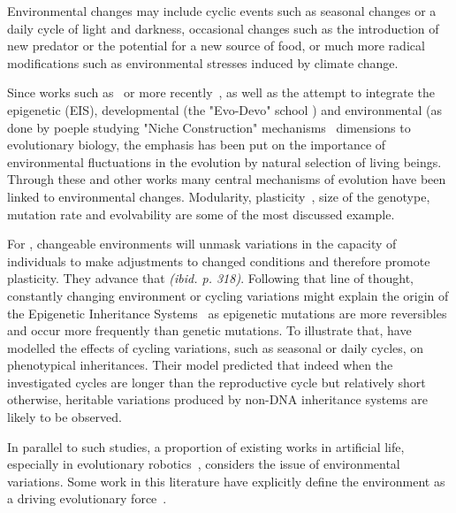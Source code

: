 Environmental changes may include cyclic events such as seasonal changes or a daily cycle of light and darkness, occasional changes such as the introduction of new predator or the potential for a new source of food, or much more radical modifications such as environmental stresses induced by climate change.

Since works such as~\citep{levins1968evolution} or more recently~\citep{jablonka2014evolution}, as well as the attempt to integrate the epigenetic (EIS), developmental (the "Evo-Devo" school \citep{muller2007evodevoextendingtheevolutionarysynthesis}) and environmental (as done by poeple studying "Niche Construction" mechanisms~\citep{laland2016anintroductiontonicheconstructiontheory} dimensions to evolutionary biology, the emphasis has been put on the importance of environmental fluctuations in the evolution by natural selection of living beings. Through these and other works many central mechanisms of evolution have been linked to environmental changes. Modularity, plasticity~\citep{west2005developmental}, size of the genotype, mutation rate and evolvability are some of the most discussed example. 

For \cite{jablonka2014evolution}, changeable environments will unmask variations in the capacity of individuals to make adjustments to changed conditions and therefore promote plasticity. They advance that \emph{(ibid. p. 318)}. Following that line of thought, constantly changing environment or cycling variations might explain the origin of the Epigenetic Inheritance Systems~\cite{heard2014transgenerationalepigeneticinheritancemythsandmechanisms} as epigenetic mutations are more reversibles and occur more frequently than genetic mutations. To illustrate that, \cite{lachmann1996inheritance} have modelled the effects of cycling variations, such as seasonal or daily cycles, on phenotypical inheritances. Their model predicted that indeed when the investigated cycles are longer than the reproductive cycle but relatively short otherwise, heritable variations produced by non-DNA inheritance systems are likely to be observed. 

In parallel to such studies, a proportion of existing works in artificial life, especially in evolutionary robotics~\citep{floreano2000evolutionary}, considers the issue of environmental variations. Some work in this literature have explicitly define the environment as a driving evolutionary force~\citep{bredeche2012environmentdrivenopenende}. %

